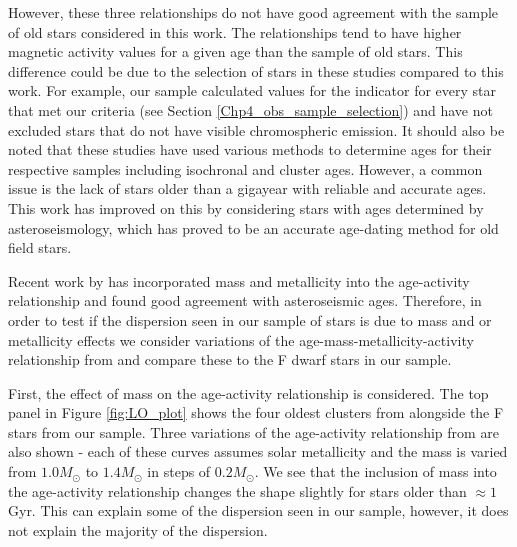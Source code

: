 However, these three relationships do not have good agreement with the sample of old stars considered in this work. The relationships tend to have higher magnetic activity values for a given age than the sample of old stars. This difference could be due to the selection of stars in these studies compared to this work. For example, our sample calculated values for the \Rprime indicator for every star that met our criteria (see Section \ref{Chp4_obs_sample_selection}) and have not excluded stars that do not have visible chromospheric emission. It should also be noted that these studies have used various methods to determine ages for their respective samples including isochronal and cluster ages. However, a common issue is the lack of stars older than a gigayear with reliable and accurate ages. This work has improved on this by considering stars with ages determined by asteroseismology, which has proved to be an accurate age-dating method for old field stars.

Recent work by \citet{Lorenzo_Oliveira_etal_2016} has incorporated mass and metallicity into the age-activity relationship and found good agreement with asteroseismic ages. Therefore, in order to test if the dispersion seen in our sample of stars is due to mass and or metallicity effects we consider variations of the age-mass-metallicity-activity relationship from \citet{Lorenzo_Oliveira_etal_2016} and compare these to the F dwarf stars in our sample.

First, the effect of mass on the age-activity relationship is considered. The top panel in Figure \ref{fig:LO_plot} shows the four oldest clusters from \citet{Mamajek_Hillenbrand_2008} alongside the F stars from our sample. Three variations of the age-activity relationship from \citet{Lorenzo_Oliveira_etal_2016} are also shown - each of these curves assumes solar metallicity and the mass is varied from $1.0 M_{\odot}$ to $1.4 M_{\odot}$ in steps of $0.2 M_{\odot}$. We see that the inclusion of mass into the age-activity relationship changes the shape slightly for stars older than $\approx 1$ Gyr. This can explain some of the dispersion seen in our sample, however, it does not explain the majority of the dispersion.


